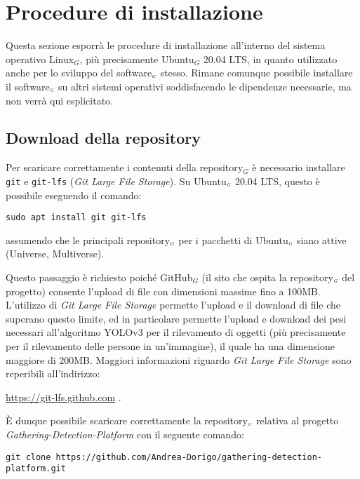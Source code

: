 \section{Procedure di installazione}\label{RequisitiDiSistemaEdInstallazioneInstallazione}
Questa sezione esporrà le procedure di installazione all'interno del sistema operativo Linux$_G$, più precisamente Ubuntu$_G$ 20.04 LTS, in quanto utilizzato anche per lo sviluppo del software$_{\scaleto{G}{3pt}}$ stesso.
Rimane comunque possibile installare il software$_{\scaleto{G}{3pt}}$ su altri sistemi operativi soddisfacendo le dipendenze necessarie, ma non verrà qui esplicitato.

\subsection{Download della  repository}\label{RequisitiDiSistemaEdInstallazioneInstallazioneDownloadRepo}
Per scaricare correttamente i contenuti della repository$_G$ è necessario installare \texttt{git} e \texttt{git-lfs} (\textit{Git Large File Storage}).
Su Ubuntu$_{\scaleto{G}{3pt}}$ 20.04 LTS, questo è possibile eseguendo il comando:
\begin{lstlisting}
sudo apt install git git-lfs
\end{lstlisting}
assumendo che le principali repository$_{\scaleto{G}{3pt}}$ per i pacchetti di Ubuntu$_{\scaleto{G}{3pt}}$ siano attive (Universe, Multiverse).

Questo passaggio è richiesto poiché GitHub$_G$ (il sito che ospita la repository$_{\scaleto{G}{3pt}}$ del progetto) consente l'upload di file con dimensioni massime fino a 100MB.
L'utilizzo di \textit{Git Large File Storage} permette l'upload e il download di file che superano questo limite, ed in particolare permette l'upload e download dei pesi necessari all'algoritmo YOLOv3 per il rilevamento di oggetti (più precisamente per il rilevamento delle persone in un'immagine), il quale ha una dimensione maggiore di 200MB. Maggiori informazioni riguardo \textit{Git Large File Storage} sono reperibili all'indirizzo:
\begin{center}
 \url{https://git-lfs.github.com} .
\end{center}

È dunque possibile scaricare correttamente la repository$_{\scaleto{G}{3pt}}$ relativa al progetto \textit{Gathering-Detection-Platform} con il seguente comando:
\begin{lstlisting}
git clone https://github.com/Andrea-Dorigo/gathering-detection-platform.git
\end{lstlisting}

